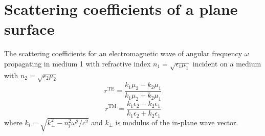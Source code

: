 \section{Scattering coefficients of a plane surface}
The scattering coefficients for an electromagnetic wave of angular frequency $\omega$ propagating in medium 1 with refractive index $n_1=\sqrt{\epsilon_1\mu_1}$ incident on a medium with $n_2 = \sqrt{\epsilon_2\mu_2}$ 
\begin{equation}
r^\text{TE}=\frac{k_1 \mu_2 - k_2 \mu_1}{k_1 \mu_2 + k_2 \mu_1}
\label{eqn:FresnelTE}
\end{equation}
\begin{equation}
r^\text{TM}=\frac{k_1 \epsilon_2 - k_2 \epsilon_1}{k_1 \epsilon_2 + k_2 \epsilon_1}
\label{eqn:FresnelTM}
\end{equation}
where $k_i = \sqrt{k_\perp^2 - n_i^2\omega^2/c^2}$ and $k_\perp$ is modulus of the in-plane wave vector.
\para